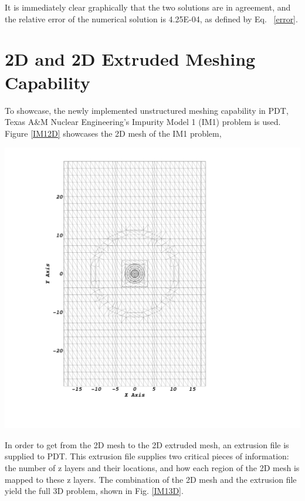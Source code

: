 It is immediately clear graphically that the two solutions are in agreement, and the relative error of the numerical solution is 4.25E-04, as defined by Eq. ~\eqref{error}.

\section{2D and 2D Extruded Meshing Capability}

To showcase, the newly implemented unstructured meshing capability in PDT, Texas A\&M Nuclear Engineering's Impurity Model 1 (IM1) problem is used. Figure \ref{IM12D} showcases the 2D mesh of the IM1 problem,

\noindent\begin{minipage}{\textwidth}
\centering
\includegraphics[scale = 0.13]{figures/im12d.png}
\label{IM12D}
\end{minipage}
\smallskip

In order to get from the 2D mesh to the 2D extruded mesh, an extrusion file is supplied to PDT. This extrusion file supplies two critical pieces of information: the number of z layers and their locations, and how each region of the 2D mesh is mapped to these z layers. The combination of the 2D mesh and the extrusion file yield the full 3D problem, shown in Fig. \ref{IM13D}.

